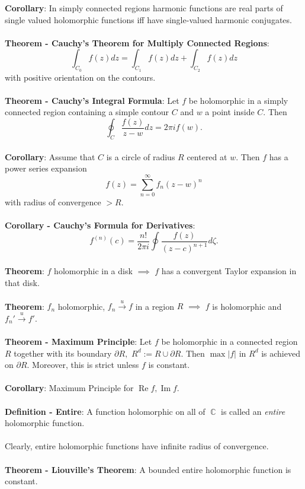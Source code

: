 \documentclass{article}
\DeclareMathOperator{\C}{\mathbb{C}}
\DeclareMathOperator{\re}{Re}
\DeclareMathOperator{\im}{Im}
\begin{document}
\textbf{Corollary}: In simply connected regions harmonic functions
are real parts of single valued holomorphic functions iff have single-valued harmonic conjugates. \\ \\
\textbf{Theorem - Cauchy's Theorem for Multiply Connected Regions}: $$\int_{C_0} f(z)dz = \int_{C_1} f(z)dz + \int_{C_2} f(z)dz$$ with positive orientation on the contours. \\ \\
\textbf{Theorem - Cauchy's Integral Formula}: Let $f$ be holomorphic in a simply connected region containing a simple contour $C$ and $w$ a point inside $C$. Then $$\oint_C \frac{f(z)}{z - w}dz = 2\pi i f(w).$$ \\
\textbf{Corollary}: Assume that $C$ is a circle of radius $R$ centered at $w$. Then $f$ has a power series expansion $$f(z) = \sum_{n = 0}^\infty f_n(z - w)^n$$ with radius of convergence $>R$. \\ \\
\textbf{Corollary - Cauchy's Formula for Derivatives}: $$f^{(n)}(c) = \frac{n!}{2\pi i} \oint \frac{f(z)}{(z - c)^{n + 1}}d\zeta.$$ \\
\textbf{Theorem}: $f$ holomorphic in a disk $\implies$ $f$ has a convergent Taylor expansion in that disk. \\ \\
\textbf{Theorem}: $f_n$ holomorphic, $f_n \xrightarrow{u} f$ in a region $R$ $\implies$ $f$ is holomorphic and $f_n' \xrightarrow{u} f'$. \\ \\
\textbf{Theorem - Maximum Principle}: Let $f$ be holomorphic in a connected region $R$
together with its boundary $\partial R,$ $R^d := R \cup \partial R.$ Then $\max|f|$ in $R^d$ is achieved on $\partial R$. Moreover, this is strict unless $f$ is constant. \\ \\
\textbf{Corollary}: Maximum Principle for $\re{f}, \im{f}$. \\ \\
\textbf{Definition - Entire}: A function holomorphic on all of $\C$ is called an \textit{entire} holomorphic function. \\ \\
Clearly, entire holomorphic functions have infinite radius of convergence. \\ \\
\textbf{Theorem - Liouville's Theorem}: A bounded entire holomorphic function is constant. \\ \\
\end{document}

